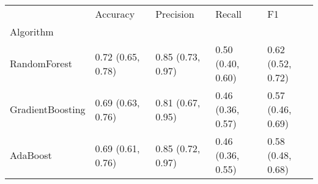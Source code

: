 \begin{tabular}{lllll}
\toprule
{} &           Accuracy &          Precision &             Recall &                 F1 \\
Algorithm        &                    &                    &                    &                    \\
\midrule
RandomForest     &  0.72 (0.65, 0.78) &  0.85 (0.73, 0.97) &  0.50 (0.40, 0.60) &  0.62 (0.52, 0.72) \\
GradientBoosting &  0.69 (0.63, 0.76) &  0.81 (0.67, 0.95) &  0.46 (0.36, 0.57) &  0.57 (0.46, 0.69) \\
AdaBoost         &  0.69 (0.61, 0.76) &  0.85 (0.72, 0.97) &  0.46 (0.36, 0.55) &  0.58 (0.48, 0.68) \\
\bottomrule
\end{tabular}

